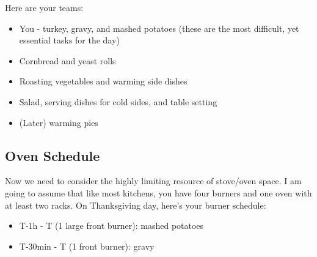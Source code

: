 \documentclass[12pt]{article}
\begin{document}
	Here are your teams:
	\begin{itemize}
		\item You - turkey, gravy, and mashed potatoes (these are the most difficult, yet essential tasks for the day)
		\item Cornbread and yeast rolls
		\item Roasting vegetables and warming side dishes
		\item Salad, serving dishes for cold sides, and table setting
		\item (Later) warming pies
	\end{itemize}
	
	\subsection{Oven Schedule}\label{sec:oven_schedule}
	Now we need to consider the highly limiting resource of stove/oven space. I am going to assume that like most kitchens, you have four burners and one oven with at least two racks. On Thanksgiving day, here's your burner schedule:
	\begin{itemize}
		\item T-1h - T (1 large front burner): mashed potatoes
		\item T-30min - T (1 front burner): gravy
	\end{itemize}
	
\end{document}
